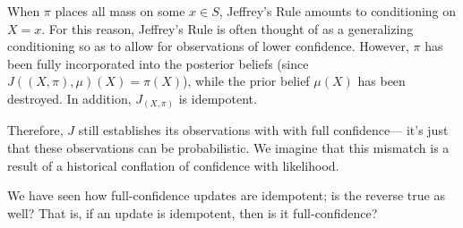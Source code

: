 \begin{subappendices}
\begin{enumerate}[wide, label=\textbf{\thesubsection.\arabic*}]
    	When $\pi$ places all mass on some $x \in S$, Jeffrey's Rule amounts to conditioning on $X {=} x$.
    	For this reason, Jeffrey's Rule is often thought of
    		as a generalizing conditioning so as to allow
    		for observations of lower confidence.
    	However, 
    	$\pi$ has been fully incorporated into the posterior beliefs
    	(since $J((X,\pi),\mu)(X) = \pi(X)$),
    	while the prior belief 
    	$\mu(X)$ has been destroyed.
    	In addition, $J_{(X,\pi)}$ is idempotent. 
    	
    	Therefore, $J$ still establishes its observations with with full confidence---%
    		it's just that these observations can be probabilistic.
    	We imagine that this mismatch is a result of a
    	historical conflation of confidence with likelihood.

    \end{enumerate}





    We have seen how full-confidence updates are idempotent; is the reverse true as well?
    That is, if an update is idempotent, then is it full-confidence? 


\end{subappendices}

